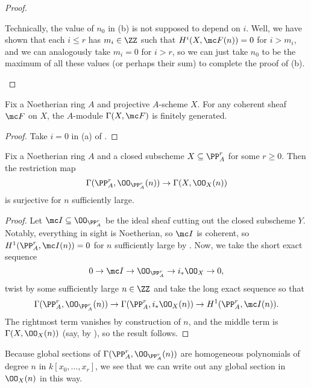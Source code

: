 \documentclass[../notes.tex]{subfiles}
\begin{document}
\begin{proof}
\begin{enumerate}
		Technically, the value of $n_0$ in (b) is not supposed to depend on $i$. Well, we have shown that each $i\le r$ has $m_i\in\ZZ$ such that $H^i(X,\mc F(n))=0$ for $i>m_i$, and we can analogously take $m_i=0$ for $i>r$, so we can just take $n_0$ to be the maximum of all these values (or perhaps their sum) to complete the proof of (b).
		\qedhere
	\end{enumerate}
\end{proof}
\begin{corollary}
	Fix a Noetherian ring $A$ and projective $A$-scheme $X$. For any coherent sheaf $\mc F$ on $X$, the $A$-module $\Gamma(X,\mc F)$ is finitely generated.
\end{corollary}
\begin{proof}
	Take $i=0$ in (a) of .
\end{proof}
\begin{corollary}
	Fix a Noetherian ring $A$ and a closed subscheme $X\subseteq\PP^r_A$ for some $r\ge0$. Then the restriction map
	\[\Gamma(\PP^r_A,\OO_{\PP^r_A}(n))\to\Gamma(X,\OO_X(n))\]
	is surjective for $n$ sufficiently large.
\end{corollary}
\begin{proof}
	Let $\mc I\subseteq\OO_{\PP^r_A}$ be the ideal sheaf cutting out the closed subscheme $Y$. Notably, everything in sight is Noetherian, so $\mc I$ is coherent, so $H^1(\PP^r_A,\mc I(n))=0$ for $n$ sufficiently large by . Now, we take the short exact sequence
	\[0\to\mc I\to\OO_{\PP^r_A}\to i_*\OO_X\to0,\]
	twist by some sufficiently large $n\in\ZZ$ and take the long exact sequence so that
	\[\Gamma(\PP^r_A,\OO_{\PP^r_A}(n))\to\Gamma(\PP^r_A,i_*\OO_X(n))\to H^1(\PP^r_A,\mc I(n)).\]
	The rightmost term vanishes by construction of $n$, and the middle term is $\Gamma(X,\OO_X(n))$ (say, by ), so the result follows.
\end{proof}
\begin{remark}
	Because global sections of $\Gamma(\PP^r_A,\OO_{\PP^r_A}(n))$ are homogeneous polynomials of degree $n$ in $k[x_0,\ldots,x_r]$, we see that we can write out any global section in $\OO_X(n)$ in this way.
\end{remark}
\end{document}
